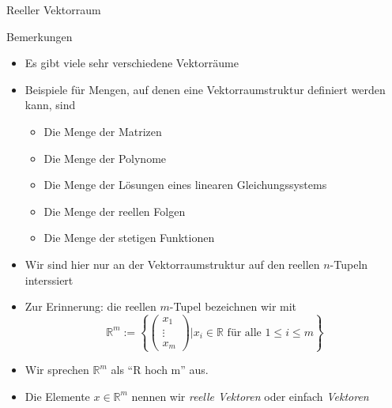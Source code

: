 \documentclass[
  8pt,
  ignorenonframetext,
]{beamer}
\providecommand{\tightlist}{%
  \setlength{\itemsep}{0pt}\setlength{\parskip}{0pt}}
\begin{document}
\begin{frame}{Reeller Vektorraum}
\protect\hypertarget{reeller-vektorraum-1}{}

\footnotesize

Bemerkungen

\begin{itemize}
\tightlist
\item
  Es gibt viele sehr verschiedene Vektorräume
\item
  Beispiele für Mengen, auf denen eine Vektorraumstruktur definiert
  werden kann, sind

  \begin{itemize}
  \tightlist
  \item
    \footnotesize Die Menge der Matrizen
  \item
    Die Menge der Polynome
  \item
    Die Menge der Lösungen eines linearen Gleichungssystems
  \item
    Die Menge der reellen Folgen
  \item
    Die Menge der stetigen Funktionen
  \end{itemize}
\item
  Wir sind hier nur an der Vektorraumstruktur auf den reellen
  \(n\)-Tupeln interssiert
\item
  Zur Erinnerung: die reellen \(m\)-Tupel bezeichnen wir mit
  \begin{equation}
  \mathbb{R}^m := \left\lbrace \begin{pmatrix} x_1 \\ \vdots \\ x_m \end{pmatrix} | x_i \in \mathbb{R} \mbox{ für alle } 1 \le i \le m \right\rbrace
  \end{equation}
\item
  Wir sprechen \(\mathbb{R}^m\) als ``R hoch m'' aus.
\item
  Die Elemente \(x \in \mathbb{R}^m\) nennen wir \emph{reelle Vektoren}
  oder einfach \emph{Vektoren}
\end{itemize}
\end{frame}
\end{document}
